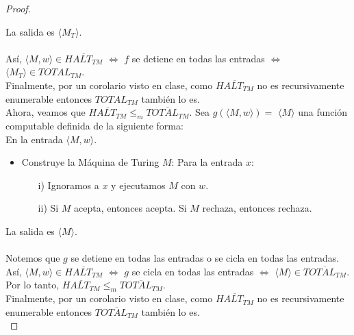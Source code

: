 \documentclass[letterpaper,10pt]{article}
\begin{document}
\begin{enumerate}
\begin{proof}
\begin{itemize}
           \end{itemize}
           
           La salida es $\langle M_{T} \rangle$.\\ \\
           Así, $\langle M, w \rangle \in \overline{HALT_{TM}}$
           $\Longleftrightarrow$ $f$ se detiene en todas las entradas
           $\Longleftrightarrow$ 
           $\langle M_{T} \rangle \in TOTAL_{TM}$. \\
           Finalmente, por un corolario visto en clase, como 
           $\overline{HALT_{TM}}$ no es recursivamente enumerable
           entonces $TOTAL_{TM}$ también lo es.\\
           
           Ahora, veamos que $\overline{HALT_{TM}} \leq_m 
           \overline{TOTAL_{TM}}$. Sea $g(\langle M, w \rangle) =$
           $\langle M \rangle$ una función computable definida de la siguiente
           forma: \\
           En la entrada $\langle M, w \rangle$.
           \begin{itemize}
               \item Construye la Máquina de Turing $M$: Para la entrada $x$:
               \begin{itemize}
                   \item[i)] Ignoramos a $x$ y ejecutamos $M$ con $w$.
                   \item[ii)] Si $M$ acepta, entonces acepta. Si $M$ rechaza,
                   entonces rechaza. 
               \end{itemize}

           \end{itemize}
           
           La salida es $\langle M \rangle$. \\ \\
           Notemos que $g$ se detiene en todas las entradas o se cicla en todas
           las entradas. \\
           Así, $\langle M, w \rangle \in \overline{HALT_{TM}}$
           $\Longleftrightarrow$ $g$ se cicla en todas las entradas
           $\Longleftrightarrow$ 
           $\langle M \rangle \in \overline{TOTAL_{TM}}$. \\
           Por lo tanto, $\overline{HALT_{TM}} \leq_m \overline{TOTAL_{TM}}$.\\
           Finalmente, por un corolario visto en clase, como
           $\overline{HALT_{TM}}$ no es recursivamente enumerable entonces
           $\overline{TOTAL_{TM}}$ también lo es. \\
       \end{proof}
       

\end{enumerate}
\end{document}
